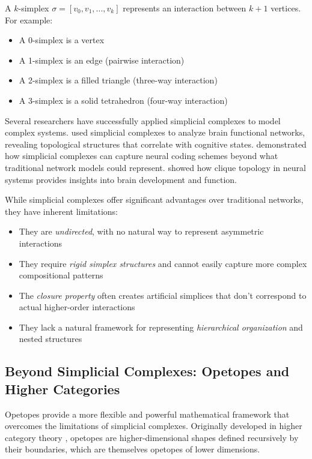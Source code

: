 A $k$-simplex $\sigma = [v_0, v_1, ..., v_k]$ represents an interaction between $k+1$ vertices. For example:
\begin{itemize}
    \item A 0-simplex is a vertex
    \item A 1-simplex is an edge (pairwise interaction)
    \item A 2-simplex is a filled triangle (three-way interaction)
    \item A 3-simplex is a solid tetrahedron (four-way interaction)
\end{itemize}

Several researchers have successfully applied simplicial complexes to model complex systems. \citet{petri2014homological} used simplicial complexes to analyze brain functional networks, revealing topological structures that correlate with cognitive states. \citet{giusti2016two} demonstrated how simplicial complexes can capture neural coding schemes beyond what traditional network models could represent. \citet{sizemore2018importance} showed how clique topology in neural systems provides insights into brain development and function.

While simplicial complexes offer significant advantages over traditional networks, they have inherent limitations:
\begin{itemize}
    \item They are \textit{undirected}, with no natural way to represent asymmetric interactions
    \item They require \textit{rigid simplex structures} and cannot easily capture more complex compositional patterns
    \item The \textit{closure property} often creates artificial simplices that don't correspond to actual higher-order interactions
    \item They lack a natural framework for representing \textit{hierarchical organization} and nested structures
\end{itemize}

\subsection{Beyond Simplicial Complexes: Opetopes and Higher Categories}
Opetopes provide a more flexible and powerful mathematical framework that overcomes the limitations of simplicial complexes. Originally developed in higher category theory \citep{cheng2004higher, kock2010polynomial}, opetopes are higher-dimensional shapes defined recursively by their boundaries, which are themselves opetopes of lower dimensions.

